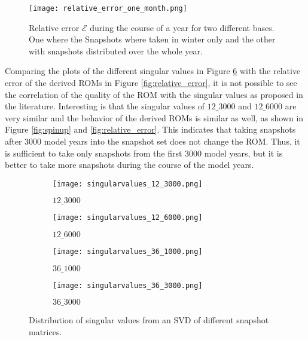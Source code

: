 \begin{figure}[H]
\centering
  \texttt{[image: relative\_error\_one\_month.png]}
  \caption[Relative error $\mathcal{E}$ during the course of a year for two different bases.]{Relative error $\mathcal{E}$ during the course of a year for two different bases. One where the Snapshots where taken in winter only and the other with snapshots distributed over the whole year.}
  \label{fig:error_one_month}
\end{figure}
Comparing the plots of the different singular values in Figure \ref{fig:comparison_differnt_singuarvalues} with the relative error of the
derived ROMs in Figure \ref{fig:relative_error}, it is not possible to see the correlation of the quality of the ROM with the singular values as proposed in the literature.
Interesting is that the singular values of $12\_3000$ and $12\_6000$ are very similar and the behavior of the derived ROMs is similar as well, 
as shown in Figure \ref{fig:spinup} and \ref{fig:relative_error}. This indicates that taking snapshots after 3000 model years into the snapshot set does not change the ROM.
Thus, it is sufficient to take only snapshots from the first 3000 model years, but it is better to take more snapshots during the course of the model years.

\begin{figure}[H]
\centering
\begin{subfigure}{.5\textwidth}
  \centering
  \texttt{[image: singularvalues\_12\_3000.png]}
  \caption{$12\_3000$}
  \label{fig:sing_sub1}
\end{subfigure}%
\begin{subfigure}{.5\textwidth}
  \centering
  \texttt{[image: singularvalues\_12\_6000.png]}
  \caption{$12\_6000$}
  \label{fig:sing_sub2}
\end{subfigure}
\begin{subfigure}{.5\textwidth}
  \centering
  \texttt{[image: singularvalues\_36\_1000.png]}
  \caption{$36\_1000$}
  \label{fig:sing_sub3}
\end{subfigure}%
\begin{subfigure}{.5\textwidth}
  \centering
  \texttt{[image: singularvalues\_36\_3000.png]}
  \caption{$36\_3000$}
  \label{fig:sing_sub4}
\end{subfigure}
\caption{Distribution of singular values from an SVD of different snapshot matrices.}
\label{fig:comparison_differnt_singuarvalues}
\end{figure}






